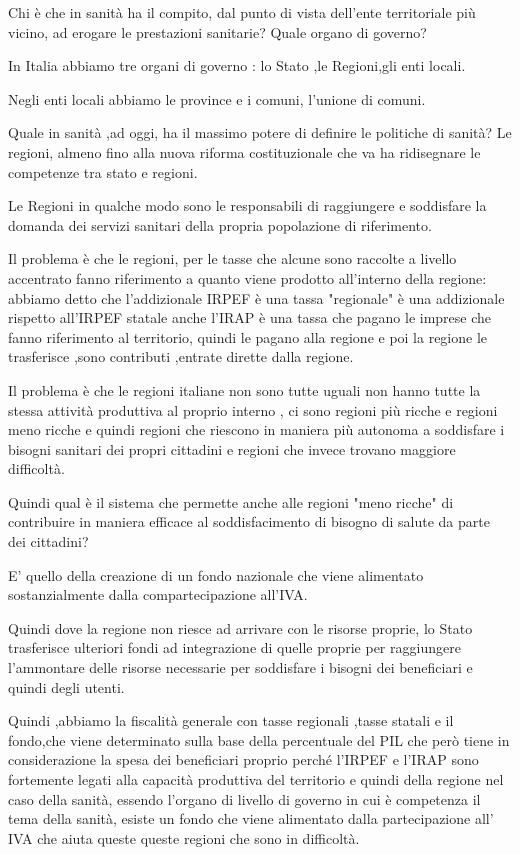 Chi è che in sanità ha il compito, dal punto di vista dell'ente
territoriale più vicino, ad erogare le prestazioni sanitarie? Quale
organo di governo?

In Italia abbiamo tre organi di governo : lo Stato ,le Regioni,gli enti
locali.

Negli enti locali abbiamo le province e i comuni, l'unione di comuni.

Quale in sanità ,ad oggi, ha il massimo potere di definire le politiche
di sanità? Le regioni, almeno fino alla nuova riforma costituzionale che
va ha ridisegnare le competenze tra stato e regioni.

Le Regioni in qualche modo sono le responsabili di raggiungere e
soddisfare la domanda dei servizi sanitari della propria popolazione di
riferimento.

Il problema è che le regioni, per le tasse che alcune sono raccolte a
livello accentrato fanno riferimento a quanto viene prodotto all'interno
della regione: abbiamo detto che l'addizionale IRPEF è una tassa
"regionale" è una addizionale rispetto all'IRPEF statale anche l'IRAP è
una tassa che pagano le imprese che fanno riferimento al territorio,
quindi le pagano alla regione e poi la regione le trasferisce ,sono
contributi ,entrate dirette dalla regione.

Il problema è che le regioni italiane non sono tutte uguali non hanno
tutte la stessa attività produttiva al proprio interno , ci sono regioni
più ricche e regioni meno ricche e quindi regioni che riescono in
maniera più autonoma a soddisfare i bisogni sanitari dei propri
cittadini e regioni che invece trovano maggiore difficoltà.

Quindi qual è il sistema che permette anche alle regioni "meno ricche"
di contribuire in maniera efficace al soddisfacimento di bisogno di
salute da parte dei cittadini?

E' quello della creazione di un fondo nazionale che viene alimentato
sostanzialmente dalla compartecipazione all'IVA.

Quindi dove la regione non riesce ad arrivare con le risorse proprie, lo
Stato trasferisce ulteriori fondi ad integrazione di quelle proprie per
raggiungere l'ammontare delle risorse necessarie per soddisfare i
bisogni dei beneficiari e quindi degli utenti.

Quindi ,abbiamo la fiscalità generale con tasse regionali ,tasse statali
e il fondo,che viene determinato sulla base della percentuale del PIL
che però tiene in considerazione la spesa dei beneficiari proprio perché
l'IRPEF e l'IRAP sono fortemente legati alla capacità produttiva del
territorio e quindi della regione nel caso della sanità, essendo
l'organo di livello di governo in cui è competenza il tema della sanità,
esiste un fondo che viene alimentato dalla partecipazione all' IVA che
aiuta queste queste regioni che sono in difficoltà.

